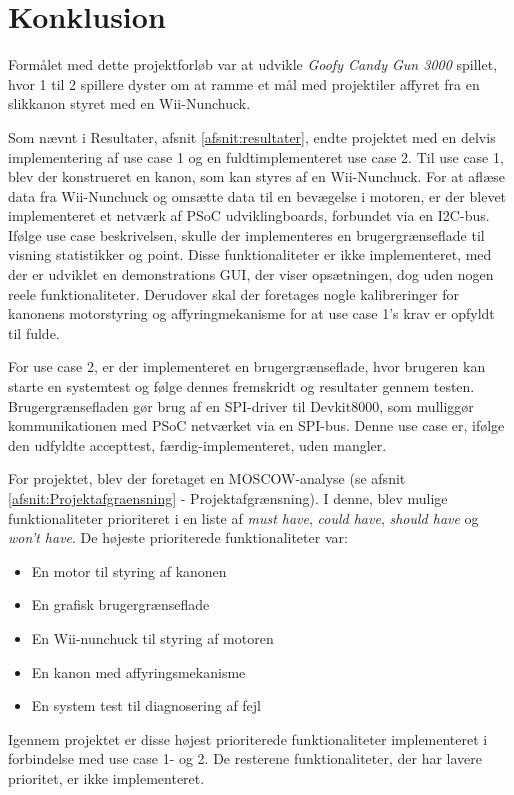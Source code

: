 \chapter{Konklusion}
Formålet med dette projektforløb var at udvikle \textit{Goofy Candy Gun 3000} spillet, hvor 1 til 2 spillere dyster om at ramme et mål med projektiler affyret fra en slikkanon styret med en Wii-Nunchuck. \newline

\noindent Som nævnt i Resultater, afsnit \ref{afsnit:resultater}, endte projektet med en delvis implementering af use case 1 og en fuldtimplementeret use case 2.
\newline \noindent Til use case 1, blev der konstrueret en kanon, som kan styres af en Wii-Nunchuck. For at aflæse data fra Wii-Nunchuck og omsætte data til en bevægelse i motoren, er der blevet implementeret et netværk af PSoC udviklingboards, forbundet via en I2C-bus. Ifølge use case beskrivelsen, skulle der implementeres en brugergrænseflade til visning statistikker og point. Disse funktionaliteter er ikke implementeret, med der er udviklet en demonstrations GUI, der viser opsætningen, dog uden nogen reele funktionaliteter.  
\noindent Derudover skal der foretages nogle kalibreringer for kanonens motorstyring og affyringmekanisme for at use case 1's krav er opfyldt til fulde.\newline 

\noindent For use case 2, er der implementeret en brugergrænseflade, hvor brugeren kan starte en systemtest og følge dennes fremskridt og resultater gennem testen. Brugergrænsefladen gør brug af en SPI-driver til Devkit8000, som mulliggør kommunikationen med PSoC netværket via en SPI-bus. Denne use case er, ifølge den udfyldte accepttest, færdig-implementeret, uden mangler. \newline

\noindent For projektet, blev der foretaget en MOSCOW-analyse (se afsnit \ref{afsnit:Projektafgraensning} - Projektafgrænsning). I denne, blev mulige funktionaliteter prioriteret i en liste af \textit{must have}, \textit{could have}, \textit{should have} og \textit{won't have}. De højeste prioriterede funktionaliteter var:

\begin{itemize}
	\item En motor til styring af kanonen
	\item En grafisk brugergrænseflade
	\item En Wii-nunchuck til styring af motoren
	\item En kanon med affyringsmekanisme
	\item En system test til diagnosering af fejl
\end{itemize}
\noindent Igennem projektet er disse højest prioriterede funktionaliteter implementeret i forbindelse med use case 1- og 2. De resterene funktionaliteter, der har lavere prioritet, er ikke implementeret.

